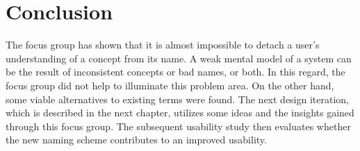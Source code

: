 \section{Conclusion}
The focus group has shown that it is almost impossible to detach a user’s understanding of a concept from its name. A weak mental model of a system can be the result of inconsistent concepts or bad names, or both. In this regard, the focus group did not help to illuminate this problem area. On the other hand, some viable alternatives to existing terms were found. The next design iteration, which is described in the next chapter, utilizes some ideas and the insights gained through this focus group. The subsequent usability study then evaluates whether the new naming scheme contributes to an improved usability.

